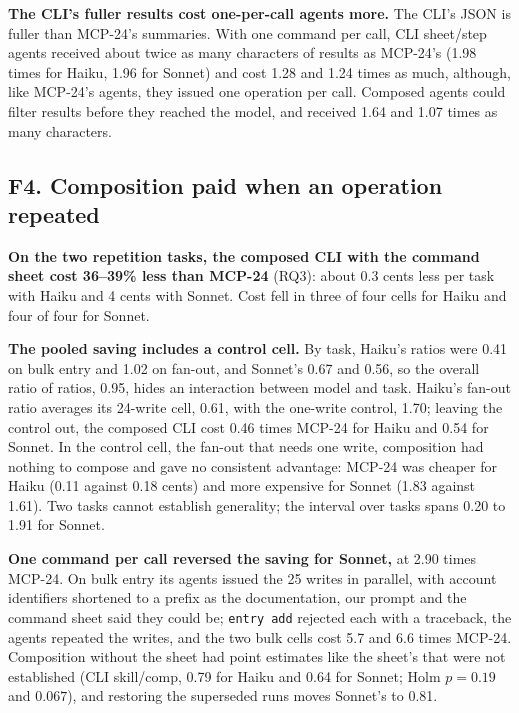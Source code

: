 \documentclass[sigconf,nonacm]{acmart}
\newcommand{\cmd}[1]{\texttt{#1}}
\newcommand{\cfg}[1]{\textsf{#1}}
\newcommand{\finding}[1]{\textbf{#1}}
\begin{document}
\finding{The CLI's fuller results cost one-per-call agents more.} The CLI's JSON is fuller than \cfg{MCP-24}'s summaries. With one command per call, \cfg{CLI sheet/step} agents received about twice as many characters of results as \cfg{MCP-24}'s (1.98 times for Haiku, 1.96 for Sonnet) and cost 1.28 and 1.24 times as much, although, like \cfg{MCP-24}'s agents, they issued one operation per call. Composed agents could filter results before they reached the model, and received 1.64 and 1.07 times as many characters.

\subsection{F4. Composition paid when an operation repeated}
\label{sec:f4}
\finding{On the two repetition tasks, the composed CLI with the command sheet cost 36--39\% less than \cfg{MCP-24}} (RQ3): about 0.3 cents less per task with Haiku and 4 cents with Sonnet. Cost fell in three of four cells for Haiku and four of four for Sonnet.

\finding{The pooled saving includes a control cell.} By task, Haiku's ratios were 0.41 on bulk entry and 1.02 on fan-out, and Sonnet's 0.67 and 0.56, so the overall ratio of ratios, 0.95, hides an interaction between model and task. Haiku's fan-out ratio averages its 24-write cell, 0.61, with the one-write control, 1.70; leaving the control out, the composed CLI cost 0.46 times \cfg{MCP-24} for Haiku and 0.54 for Sonnet. In the control cell, the fan-out that needs one write, composition had nothing to compose and gave no consistent advantage: \cfg{MCP-24} was cheaper for Haiku (0.11 against 0.18 cents) and more expensive for Sonnet (1.83 against 1.61). Two tasks cannot establish generality; the interval over tasks spans 0.20 to 1.91 for Sonnet.

\finding{One command per call reversed the saving for Sonnet,} at 2.90 times \cfg{MCP-24}. On bulk entry its agents issued the 25 writes in parallel, with account identifiers shortened to a prefix as the documentation, our prompt and the command sheet said they could be; \cmd{entry add} rejected each with a traceback, the agents repeated the writes, and the two bulk cells cost 5.7 and 6.6 times \cfg{MCP-24}. Composition without the sheet had point estimates like the sheet's that were not established (\cfg{CLI skill/comp}, 0.79 for Haiku and 0.64 for Sonnet; Holm $p = 0.19$ and $0.067$), and restoring the superseded runs moves Sonnet's to 0.81.
\end{document}
